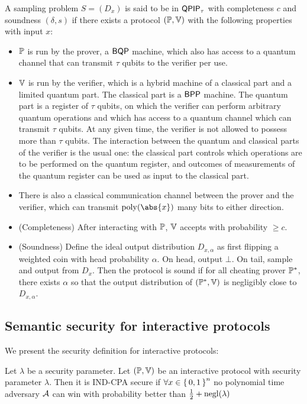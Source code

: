 \begin{definition}
	A sampling problem $S=(D_x)$ is said to be in $\operatorname{\mathsf{QPIP}}_\tau$ with completeness $c$ and soundness $(\delta, s)$ if there exists a protocol $(\mathbb{P}, \mathbb{V})$ with the following properties with input $x$:
	\begin{itemize}
		\item $\mathbb{P}$ is run by the prover, a $\operatorname{\mathsf{BQP}}$ machine, which also has access to a quantum channel that can transmit $\tau$ qubits to the verifier per use.
		\item $\mathbb{V}$ is run by the verifier, which is a hybrid machine of a classical part and a limited quantum part. The classical part is a $\operatorname{\mathsf{BPP}}$ machine. The quantum part is a register of $\tau$ qubits, on which the verifier can perform arbitrary quantum operations and which has access to a quantum channel which can transmit $\tau$ qubits. At any given time, the verifier is not allowed to possess more than $\tau$ qubits. The interaction between the quantum and classical parts of the verifier is the usual one: the classical part controls which operations are to be performed on the quantum register, and outcomes of measurements of the quantum register can be used as input to the classical part.
		\item There is also a classical communication channel between the prover and the verifier, which can transmit $\poly(\abs{x})$ many bits to either direction. 
		\item (Completeness) After interacting with $\mathbb{P}$, $\mathbb{V}$ accepts with probability $\geq c$.
		\item (Soundness) Define the ideal output distribution $D_{x, \alpha}$ as first flipping a weighted coin with head probability $\alpha$. On head, output $\bot$. On tail, sample and output from $D_x$.
			Then the protocol is sound if for all cheating prover $\mathbb{P}^*$, there exists $\alpha$ so that the output distribution of $(\mathbb{P}^*, \mathbb{V})$ is negligibly close to $D_{x, \alpha}$.
	\end{itemize}
\end{definition}

\subsection{Semantic security for interactive protocols}

We present the security definition for interactive protocols:

\begin{dfn}
	Let $\lambda$ be a security parameter.
	Let $(\mathbb{P}, \mathbb{V})$ be an interactive protocol with security parameter $\lambda$.
	Then it is IND-CPA secure if $\forall x\in\set{0,1}^n$ no polynomial time adversary $\mathcal{A}$ can win  with probability better than $\frac{1}{2}+\operatorname{negl}(\lambda)$
\end{dfn}

